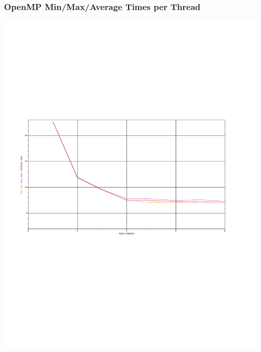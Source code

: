 \documentclass{article}
\begin{document}
\subsubsection*{OpenMP Min/Max/Average Times per Thread}
\includegraphics[scale=0.5]{images/omp_times.pdf}
\end{document}
